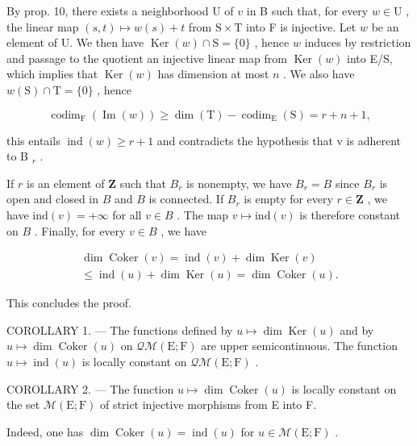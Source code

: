 By prop. 10, there exists a neighborhood U of \(v\) in B such that, for every \(w \in \mathrm{U}\) , the linear map \((s,t) \mapsto w(s) + t\) from \(\mathrm{S} \times \mathrm{T}\) into F is injective. Let \(w\) be an element of U. We then have \(\operatorname{Ker}(w) \cap \mathrm{S} = \{0\}\) , hence \(w\) induces by restriction and passage to the quotient an injective linear map from \(\operatorname{Ker}(w)\) into E/S, which implies that \(\operatorname{Ker}(w)\) has dimension at most \(n\) . We also have \(w(\mathrm{S}) \cap \mathrm{T} = \{0\}\) , hence

\[
\operatorname{codim} _ {\mathrm{F}} (\operatorname{Im} (w)) \geqslant \dim (\mathrm{T}) - \operatorname{codim} _ {\mathrm{E}} (\mathrm{S}) = r + n + 1,
\]

this entails \(\operatorname{ind}(w) \geqslant r + 1\) and contradicts the hypothesis that v is adherent to B \(_{r}\) .

If \(r\) is an element of \(\mathbf{Z}\) such that \(B_r\) is nonempty, we have \(B_r = B\) since \(B_r\) is open and closed in \(B\) and \(B\) is connected. If \(B_r\) is empty for every \(r \in \mathbf{Z}\) , we have \(\text{ind}(v) = +\infty\) for all \(v \in B\) . The map \(v \mapsto \text{ind}(v)\) is therefore constant on \(B\) . Finally, for every \(v \in B\) , we have

\[
\begin{array}{c} \dim \operatorname{Coker} (v) = \operatorname{ind} (v) + \dim \operatorname{Ker} (v) \\ \leqslant \operatorname{ind} (u) + \dim \operatorname{Ker} (u) = \dim \operatorname{Coker} (u). \end{array}
\]

This concludes the proof.

COROLLARY 1. --- The functions defined by \(u \mapsto \dim \operatorname{Ker}(u)\) and by \(u \mapsto \dim \operatorname{Coker}(u)\) on \(\mathcal{Q}\mathcal{M}(\mathrm{E};\mathrm{F})\) are upper semicontinuous. The function \(u \mapsto \operatorname{ind}(u)\) is locally constant on \(\mathcal{Q}\mathcal{M}(\mathrm{E};\mathrm{F})\) .

COROLLARY 2. --- The function \(u \mapsto \dim \operatorname{Coker}(u)\) is locally constant on the set \(\mathcal{M}(\mathrm{E};\mathrm{F})\) of strict injective morphisms from E into F.

Indeed, one has \(\dim \operatorname{Coker}(u) = \operatorname{ind}(u)\) for \(u \in \mathcal{M}(\mathrm{E};\mathrm{F})\) .

